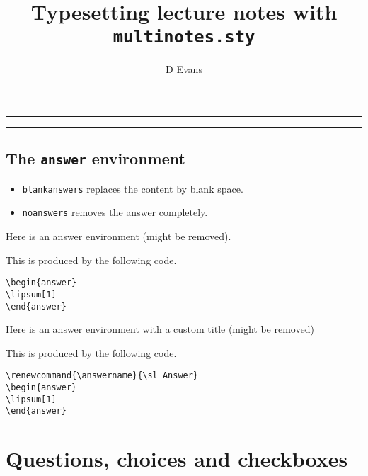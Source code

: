 \documentclass{article}
\title{Typesetting lecture notes with {\tt multinotes.sty}}
\author{D Evans}
\begin{document}
\maketitle
\tableofcontents

\bigskip\hrule\bigskip

\exercisename

\bigskip\hrule\bigskip

\subsection*{The {\tt answer} environment}

\begin{itemize}
\item {\tt blankanswers} replaces the content by blank space. 
\item {\tt noanswers} removes the answer completely.
\end{itemize}

Here is an answer environment (might be removed).
\begin{answer}
\lipsum[1]
\end{answer}

This is produced by the following code.
\begin{Verbatim}[frame=single]
\begin{answer}
\lipsum[1]
\end{answer}
\end{Verbatim}

Here is an answer environment with a custom title (might be removed)

\renewcommand{\answername}{\sl Answer}
\begin{answer}
\lipsum[1]
\end{answer}

This is produced by the following code.
\begin{Verbatim}[frame=single]
\renewcommand{\answername}{\sl Answer}
\begin{answer}
\lipsum[1]
\end{answer}
\end{Verbatim}

\section{Questions, choices and checkboxes}
\end{document}
